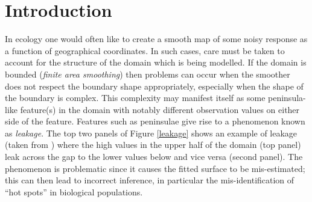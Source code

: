 \documentclass[smallextended]{svjour3}       %
\begin{document}
\section{Introduction \label{IN}}

In ecology one would often like to create a smooth map of some noisy response as a function of geographical coordinates. In such cases, care must be taken to account for the structure of the domain which is being modelled. If the domain is bounded (\textit{finite area smoothing}) then problems can occur when the smoother does not respect the boundary shape appropriately, especially when the shape of the boundary is complex. This complexity may manifest itself as some peninsula-like feature(s) in the domain with notably different observation values on either side of the feature. Features such as peninsulae give rise to a phenomenon known as \emph{leakage}. The top two panels of Figure \ref{leakage} shows an example of leakage (taken from \cite{Wood:2008vo}) where the high values in the upper half of the domain (top panel) leak across the gap to the lower values below and vice versa (second panel). The phenomenon is problematic since it causes the fitted surface to be mis-estimated; this can then lead to incorrect inference, in particular the mis-identification of ``hot spots'' in biological populations.
\end{document}
